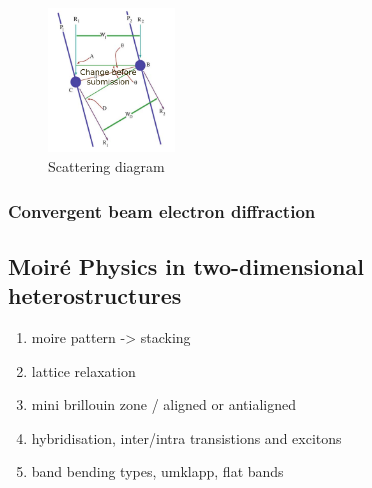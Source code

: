 \begin{figure}
    \centering
    \includegraphics[width=0.3\textwidth, keepaspectratio]{resources/Figures/scattering.png}
    \caption{Scattering diagram}
    \label{fig:scatt_angle}
\end{figure}

\subsubsection{Convergent beam electron diffraction}



\subsection{Moiré Physics in two-dimensional heterostructures}
\begin{enumerate}
    \item moire pattern -> stacking
    \item lattice relaxation
    \item mini brillouin zone / aligned or antialigned
    \item hybridisation, inter/intra transistions and excitons
    \item band bending types, umklapp,  flat bands
\end{enumerate}


